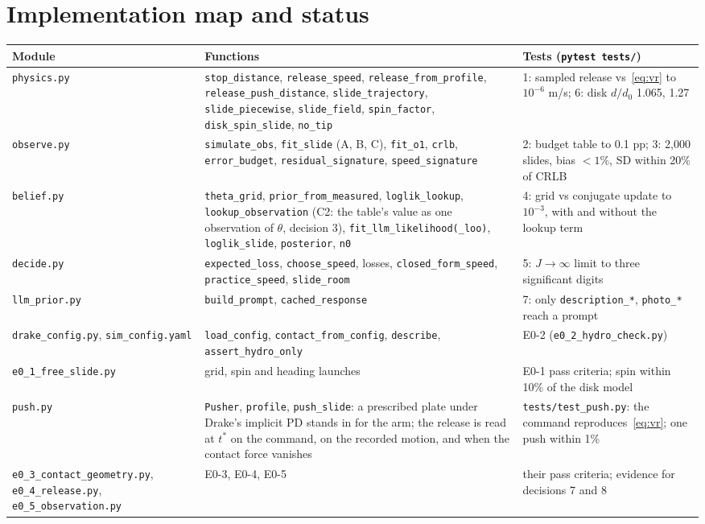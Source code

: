 \documentclass[10pt]{article}
\newcommand{\code}[1]{\texttt{#1}}
\begin{document}
\section{Implementation map and status}
\label{sec:impl}
\begin{center}\small
\begin{tabular}{@{}lp{7.6cm}p{5.2cm}@{}}
\toprule
Module & Functions & Tests (\code{pytest tests/})\\
\midrule
\code{physics.py} & \code{stop\_distance}, \code{release\_speed}, \code{release\_from\_profile}, \code{release\_push\_distance}, \code{slide\_trajectory}, \code{slide\_piecewise}, \code{slide\_field}, \code{spin\_factor}, \code{disk\_spin\_slide}, \code{no\_tip} & 1: sampled release vs~\eqref{eq:vr} to $10^{-6}$ m/s; 6: disk $d/d_0$ 1.065, 1.27\\
\code{observe.py} & \code{simulate\_obs}, \code{fit\_slide} (A, B, C), \code{fit\_o1}, \code{crlb}, \code{error\_budget}, \code{residual\_signature}, \code{speed\_signature} & 2: budget table to 0.1 pp; 3: 2,000 slides, bias $<1\%$, SD within 20\% of CRLB\\
\code{belief.py} & \code{theta\_grid}, \code{prior\_from\_measured}, \code{loglik\_lookup}, \code{lookup\_observation} (C2: the table's value as one observation of $\theta$, decision 3), \code{fit\_llm\_likelihood(\_loo)}, \code{loglik\_slide}, \code{posterior}, \code{n0} & 4: grid vs conjugate update to $10^{-3}$, with and without the lookup term\\
\code{decide.py} & \code{expected\_loss}, \code{choose\_speed}, losses, \code{closed\_form\_speed}, \code{practice\_speed}, \code{slide\_room} & 5: $J\to\infty$ limit to three significant digits\\
\code{llm\_prior.py} & \code{build\_prompt}, \code{cached\_response} & 7: only \code{description\_*}, \code{photo\_*} reach a prompt\\
\code{drake\_config.py}, \code{sim\_config.yaml} & \code{load\_config}, \code{contact\_from\_config}, \code{describe}, \code{assert\_hydro\_only} & E0-2 (\code{e0\_2\_hydro\_check.py})\\
\code{e0\_1\_free\_slide.py} & grid, spin and heading launches & E0-1 pass criteria; spin within 10\% of the disk model\\
\code{push.py} & \code{Pusher}, \code{profile}, \code{push\_slide}: a prescribed plate under Drake's implicit PD stands in for the arm; the release is read at $t^*$ on the command, on the recorded motion, and when the contact force vanishes & \code{tests/test\_push.py}: the command reproduces~\eqref{eq:vr}; one push within 1\%\\
\code{e0\_3\_contact\_geometry.py}, \code{e0\_4\_release.py}, \code{e0\_5\_observation.py} & E0-3, E0-4, E0-5 & their pass criteria; evidence for decisions 7 and 8\\
\bottomrule
\end{tabular}
\end{center}
\end{document}
